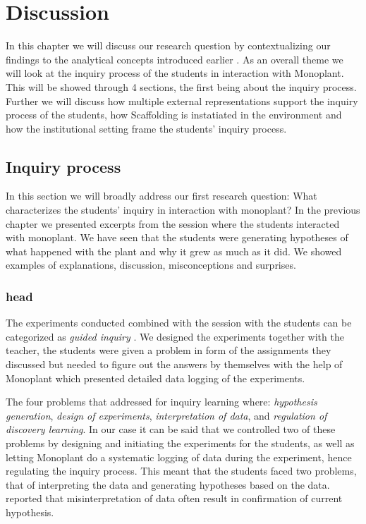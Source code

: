 \chapter{Discussion}
In this chapter we will discuss our research question by contextualizing our findings to the analytical concepts introduced earlier . As an overall theme we will look at the inquiry process of the students in interaction with Monoplant. This will be showed through 4 sections, the first being about the inquiry process. Further we will discuss how multiple external representations support the inquiry process of the students, how Scaffolding is instatiated in the environment and how the institutional setting frame the students' inquiry process.

\section{Inquiry process}
In this section we will broadly address our first research question: What characterizes the students’ inquiry in interaction with monoplant? 
In the previous chapter we presented excerpts from the session where the students interacted with monoplant. We have seen that the students were generating hypotheses of what happened with the plant and why it grew as much as it did. We showed examples of explanations, discussion, misconceptions and surprises.

\subsection{head}
The experiments conducted combined with the session with the students can be categorized as \emph{guided inquiry} \citeauthor*{staver1987analysis} \citetext{\citeyear{staver1987analysis}, referenced in \citealp{prince2006inductive}}. We designed the experiments together with the teacher, the students were given a problem in form of the assignments they discussed but needed to figure out the answers by themselves with the help of Monoplant which presented detailed data logging of the experiments.

The four problems that \citet{de1998scientific} addressed for inquiry learning where: \textit{hypothesis generation}, \textit{design of experiments}, \textit{interpretation of data}, and \textit{regulation of discovery learning}. In our case it can be said that we controlled two of these problems by designing and initiating the experiments for the students, as well as letting Monoplant do a systematic logging of data during the experiment, hence regulating the inquiry process. This meant that the students faced two problems, that of interpreting the data and generating hypotheses based on the data. \citeauthor*{klahr1993heuristics} \citetext{\citeyear{klahr1993heuristics}, referenced in \citealp{de1998scientific}} reported that misinterpretation of data often result in confirmation of current hypothesis. 

